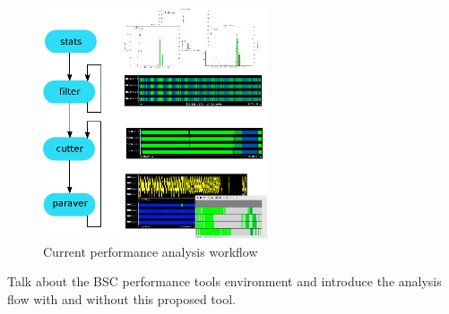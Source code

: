 \documentclass[12pt]{report}
\begin{document}
\begin{figure}
  \caption{Current performance analysis workflow}
  \label{currentAnalysisFlow}
  \centering
    \includegraphics[width=250px]{current_analysis_flow.eps}
\end{figure}


Talk about the BSC performance tools environment and introduce the analysis flow
with and without this proposed tool.





\end{document}
